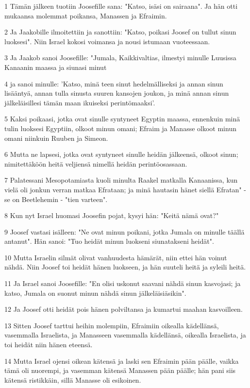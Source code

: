 \par 1 Tämän jälkeen tuotiin Joosefille sana: "Katso, isäsi on sairaana". Ja hän otti mukaansa molemmat poikansa, Manassen ja Efraimin.
\par 2 Ja Jaakobille ilmoitettiin ja sanottiin: "Katso, poikasi Joosef on tullut sinun luoksesi". Niin Israel kokosi voimansa ja nousi istumaan vuoteessaan.
\par 3 Ja Jaakob sanoi Joosefille: "Jumala, Kaikkivaltias, ilmestyi minulle Luusissa Kanaanin maassa ja siunasi minut
\par 4 ja sanoi minulle: 'Katso, minä teen sinut hedelmälliseksi ja annan sinun lisääntyä, annan tulla sinusta suuren kansojen joukon, ja minä annan sinun jälkeläisillesi tämän maan ikuiseksi perintömaaksi'.
\par 5 Kaksi poikaasi, jotka ovat sinulle syntyneet Egyptin maassa, ennenkuin minä tulin luoksesi Egyptiin, olkoot minun omani; Efraim ja Manasse olkoot minun omani niinkuin Ruuben ja Simeon.
\par 6 Mutta ne lapsesi, jotka ovat syntyneet sinulle heidän jälkeensä, olkoot sinun; nimitettäköön heitä veljiensä nimellä heidän perintöosassaan.
\par 7 Palatessani Mesopotamiasta kuoli minulta Raakel matkalla Kanaanissa, kun vielä oli jonkun verran matkaa Efrataan; ja minä hautasin hänet siellä Efratan" - se on Beetlehemin - "tien varteen".
\par 8 Kun nyt Israel huomasi Joosefin pojat, kysyi hän: "Keitä nämä ovat?"
\par 9 Joosef vastasi isälleen: "Ne ovat minun poikani, jotka Jumala on minulle täällä antanut". Hän sanoi: "Tuo heidät minun luokseni siunatakseni heidät".
\par 10 Mutta Israelin silmät olivat vanhuudesta hämärät, niin ettei hän voinut nähdä. Niin Joosef toi heidät hänen luokseen, ja hän suuteli heitä ja syleili heitä.
\par 11 Ja Israel sanoi Joosefille: "En olisi uskonut saavani nähdä sinun kasvojasi; ja katso, Jumala on suonut minun nähdä sinun jälkeläisiäsikin".
\par 12 Ja Joosef otti heidät pois hänen polviltansa ja kumartui maahan kasvoilleen.
\par 13 Sitten Joosef tarttui heihin molempiin, Efraimiin oikealla kädellänsä, vasemmalla Israelista, ja Manasseen vasemmalla kädellänsä, oikealla Israelista, ja toi heidät niin hänen eteensä.
\par 14 Mutta Israel ojensi oikean kätensä ja laski sen Efraimin pään päälle, vaikka tämä oli nuorempi, ja vasemman kätensä Manassen pään päälle; hän pani siis kätensä ristikkäin, sillä Manasse oli esikoinen.
